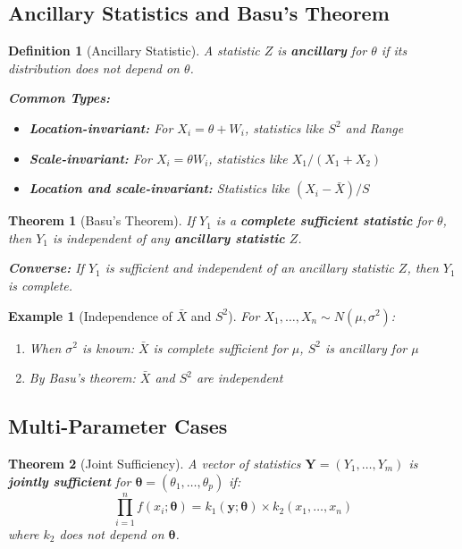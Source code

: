 \documentclass[12pt,a4paper]{amsart}
\newtheorem{theorem}{Theorem}[section]
\newtheorem{definition}{Definition}[section]
\newtheorem{example}{Example}[section]
\theoremstyle{remark}
\begin{document}
\subsection{Ancillary Statistics and Basu's Theorem}

\begin{definition}[Ancillary Statistic]
A statistic $Z$ is \textbf{ancillary} for $\theta$ if its distribution does not depend on $\theta$.

\textbf{Common Types:}
\begin{itemize}
\item \textbf{Location-invariant:} For $X_i = \theta + W_i$, statistics like $S^2$ and Range
\item \textbf{Scale-invariant:} For $X_i = \theta W_i$, statistics like $X_1/(X_1 + X_2)$
\item \textbf{Location and scale-invariant:} Statistics like $(X_i - \bar{X})/S$
\end{itemize}
\end{definition}

\begin{theorem}[Basu's Theorem]
If $Y_1$ is a \textbf{complete sufficient statistic} for $\theta$, then $Y_1$ is independent of any \textbf{ancillary statistic} $Z$.

\textbf{Converse:} If $Y_1$ is sufficient and independent of an ancillary statistic $Z$, then $Y_1$ is complete.
\end{theorem}

\begin{example}[Independence of $\bar{X}$ and $S^2$]
For $X_1, \ldots, X_n \sim N(\mu, \sigma^2)$:
\begin{enumerate}
\item When $\sigma^2$ is known: $\bar{X}$ is complete sufficient for $\mu$, $S^2$ is ancillary for $\mu$
\item By Basu's theorem: $\bar{X}$ and $S^2$ are independent
\end{enumerate}
\end{example}

\subsection{Multi-Parameter Cases}

\begin{theorem}[Joint Sufficiency]
A vector of statistics $\mathbf{Y} = (Y_1, \ldots, Y_m)$ is \textbf{jointly sufficient} for $\boldsymbol{\theta} = (\theta_1, \ldots, \theta_p)$ if:
$$\prod_{i=1}^n f(x_i; \boldsymbol{\theta}) = k_1(\mathbf{y}; \boldsymbol{\theta}) \times k_2(x_1, \ldots, x_n)$$
where $k_2$ does not depend on $\boldsymbol{\theta}$.
\end{theorem}
\end{document}
